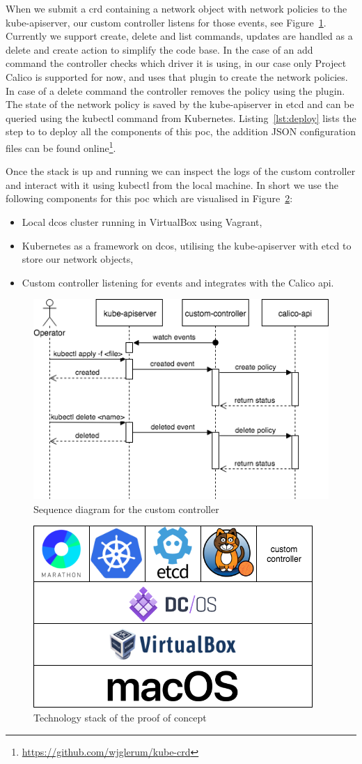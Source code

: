 When we submit a \gls{crd} containing a network object with network policies to the kube-apiserver, our custom controller listens for those events, see Figure~\ref{fig:custrom-controller-sequence-diagram}. Currently we support create, delete and list commands, updates are handled as a delete and create action to simplify the code base. In the case of an add command the controller checks which driver it is using, in our case only Project Calico is supported for now, and uses that plugin to create the network policies. In case of a delete command the controller removes the policy using the plugin. The state of the network policy is saved by the kube-apiserver in etcd and can be queried using the kubectl command from Kubernetes. Listing~\ref{lst:deploy} lists the step to to deploy all the components of this \gls{poc}, the addition JSON configuration files can be found online\footnote{\url{https://github.com/wjglerum/kube-crd}}. 

Once the stack is up and running we can inspect the logs of the custom controller and interact with it using kubectl from the local machine. In short we use the following components for this \gls{poc} which are visualised in Figure~\ref{fig:poc-stack}:
\begin{itemize}
    \item Local \gls{dcos} cluster running in VirtualBox\cite{virtualbox} using Vagrant\cite{vagrant},
    \item Kubernetes as a framework on \gls{dcos}, utilising the kube-apiserver with etcd to store our network objects,
    \item Custom controller listening for events and integrates with the Calico \gls{api}.
\end{itemize}

\begin{figure}
    \centering
    \includegraphics[width=0.7\columnwidth]{images/customer-controller-sequence-diagram}
    \caption{Sequence diagram for the custom controller}
    \label{fig:custrom-controller-sequence-diagram}
\end{figure}

\begin{figure}
    \centering
    \includegraphics[width=0.6\columnwidth]{images/poc-stack}
    \caption{Technology stack of the proof of concept}
    \label{fig:poc-stack}
\end{figure}
